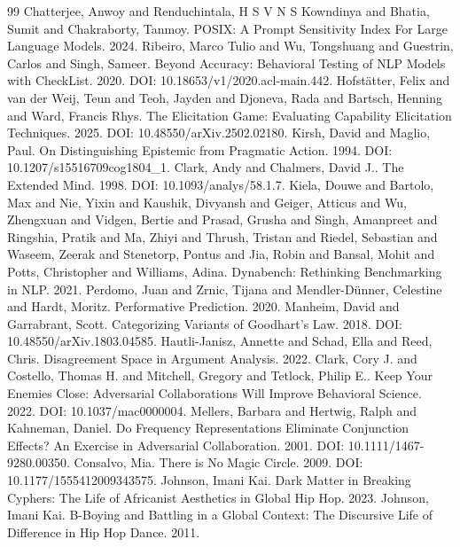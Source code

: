 \documentclass[11pt]{article}
\begin{document}
\begin{thebibliography}{99}
 Chatterjee, Anwoy and Renduchintala, H S V N S Kowndinya and Bhatia, Sumit and Chakraborty, Tanmoy. POSIX: A Prompt Sensitivity Index For Large Language Models. 2024.
 Ribeiro, Marco Tulio and Wu, Tongshuang and Guestrin, Carlos and Singh, Sameer. Beyond Accuracy: Behavioral Testing of NLP Models with CheckList. 2020. DOI: 10.18653/v1/2020.acl-main.442.
 Hofst{\"a}tter, Felix and van der Weij, Teun and Teoh, Jayden and Djoneva, Rada and Bartsch, Henning and Ward, Francis Rhys. The Elicitation Game: Evaluating Capability Elicitation Techniques. 2025. DOI: 10.48550/arXiv.2502.02180.
 Kirsh, David and Maglio, Paul. On Distinguishing Epistemic from Pragmatic Action. 1994. DOI: 10.1207/s15516709cog1804\_1.
 Clark, Andy and Chalmers, David J.. The Extended Mind. 1998. DOI: 10.1093/analys/58.1.7.
 Kiela, Douwe and Bartolo, Max and Nie, Yixin and Kaushik, Divyansh and Geiger, Atticus and Wu, Zhengxuan and Vidgen, Bertie and Prasad, Grusha and Singh, Amanpreet and Ringshia, Pratik and Ma, Zhiyi and Thrush, Tristan and Riedel, Sebastian and Waseem, Zeerak and Stenetorp, Pontus and Jia, Robin and Bansal, Mohit and Potts, Christopher and Williams, Adina. Dynabench: Rethinking Benchmarking in NLP. 2021.
 Perdomo, Juan and Zrnic, Tijana and Mendler-D{\"u}nner, Celestine and Hardt, Moritz. Performative Prediction. 2020.
 Manheim, David and Garrabrant, Scott. Categorizing Variants of Goodhart's Law. 2018. DOI: 10.48550/arXiv.1803.04585.
 Hautli-Janisz, Annette and Schad, Ella and Reed, Chris. Disagreement Space in Argument Analysis. 2022.
 Clark, Cory J. and Costello, Thomas H. and Mitchell, Gregory and Tetlock, Philip E.. Keep Your Enemies Close: Adversarial Collaborations Will Improve Behavioral Science. 2022. DOI: 10.1037/mac0000004.
 Mellers, Barbara and Hertwig, Ralph and Kahneman, Daniel. Do Frequency Representations Eliminate Conjunction Effects? An Exercise in Adversarial Collaboration. 2001. DOI: 10.1111/1467-9280.00350.
 Consalvo, Mia. There is No Magic Circle. 2009. DOI: 10.1177/1555412009343575.
 Johnson, Imani Kai. Dark Matter in Breaking Cyphers: The Life of Africanist Aesthetics in Global Hip Hop. 2023.
 Johnson, Imani Kai. B-Boying and Battling in a Global Context: The Discursive Life of Difference in Hip Hop Dance. 2011.
\end{thebibliography}
\end{document}
